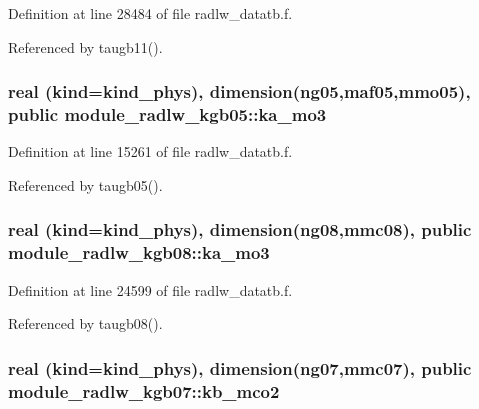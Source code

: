 Definition at line 28484 of file radlw\+\_\+datatb.\+f.



Referenced by taugb11().

\subsubsection[{\texorpdfstring{ka\+\_\+mo3}{ka_mo3}}]{\setlength{\rightskip}{0pt plus 5cm}real (kind=kind\+\_\+phys), dimension(ng05,maf05,mmo05), public module\+\_\+radlw\+\_\+kgb05\+::ka\+\_\+mo3}\hypertarget{group__module__radlw__main_ga6021fc2f60379615b7882a28e1caa1e9}{}\label{group__module__radlw__main_ga6021fc2f60379615b7882a28e1caa1e9}


Definition at line 15261 of file radlw\+\_\+datatb.\+f.



Referenced by taugb05().

\subsubsection[{\texorpdfstring{ka\+\_\+mo3}{ka_mo3}}]{\setlength{\rightskip}{0pt plus 5cm}real (kind=kind\+\_\+phys), dimension(ng08,mmc08), public module\+\_\+radlw\+\_\+kgb08\+::ka\+\_\+mo3}\hypertarget{group__module__radlw__main_ga7dec65e880c278f44419c1ae01490eae}{}\label{group__module__radlw__main_ga7dec65e880c278f44419c1ae01490eae}


Definition at line 24599 of file radlw\+\_\+datatb.\+f.



Referenced by taugb08().

\subsubsection[{\texorpdfstring{kb\+\_\+mco2}{kb_mco2}}]{\setlength{\rightskip}{0pt plus 5cm}real (kind=kind\+\_\+phys), dimension(ng07,mmc07), public module\+\_\+radlw\+\_\+kgb07\+::kb\+\_\+mco2}\hypertarget{group__module__radlw__main_ga2dcfbe76332d559cda48c7ba065ab349}{}\label{group__module__radlw__main_ga2dcfbe76332d559cda48c7ba065ab349}


